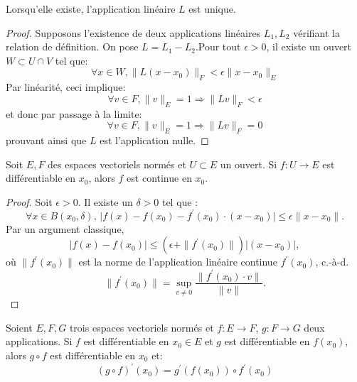\begin{prop}
Lorsqu'elle existe, l'application linéaire $L$ est unique.
\end{prop}
\begin{proof}
Supposons l'existence de deux applications linéaires  $L_1, L_2$ vérifiant la relation de définition. On pose $L =  L_1 - L_2$.Pour tout $\epsilon > 0$, il existe un ouvert $W \subset U \cap V$ tel que:
\[
\forall x \in W, \|L(x-x_0)\|_F < \epsilon \| x-x_0 \|_E
\]
Par linéarité, ceci implique:
\[
\forall v \in F, \|v\|_E = 1 \Rightarrow \|L v \|_F < \epsilon 
\]
et donc par passage à la limite:
\[
\forall v \in F, \|v\|_E = 1 \Rightarrow \|L v \|_F = 0
\]
prouvant ainsi que $L$ est l'application nulle.
\end{proof}
\begin{fprop}\label{prop:1.1}
  Soit $E,F$ des espaces vectoriels normés et $U \subset E$ un ouvert. 
Si $f \colon U \to E$ est différentiable en $x_0$, alors $f$ est continue en $x_0$.
\end{fprop}
\begin{proof}
Soit $\epsilon > 0$. Il existe un $\delta >0$ tel que :
\[ \forall x \in B(x_0,\delta), \, \lvert f(x) - f(x_0) -f^\prime(x_0)\cdot(x-x_0) \rvert \leq \epsilon \|x-x_0\|.\]
Par un argument classique,
\[\lvert f(x) -f(x_0)\rvert \leq \left(\epsilon + \|f^\prime(x_0)\| \right)\lvert (x-x_0) \rvert,\]
où $\|f^\prime(x_0)\|$ est la norme de l'application linéaire continue $f^\prime(x_0)$, c.-à-d. 
\[ \|f^\prime(x_0)\| = \sup_{v \neq 0} \frac{\|f^\prime(x_0) \cdot v\|}{\|v\|}.\]
\end{proof}
\begin{fprop}
  \label{prop:der_compo}
Soient $E,F,G$ trois espaces vectoriels normés et $f \colon E \to F$, $g \colon F \to G$ deux applications. Si $f$ est différentiable en $x_0 \in E$ et $g$ 
est différentiable en $f(x_0)$, alors $g \circ f$ est différentiable en $x_0$ et:
\begin{equation}
  \left( g \circ f \right)^\prime(x_0) = g^\prime\left( f(x_0) \right) \circ f^\prime(x_0)
\end{equation} 
\end{fprop}
